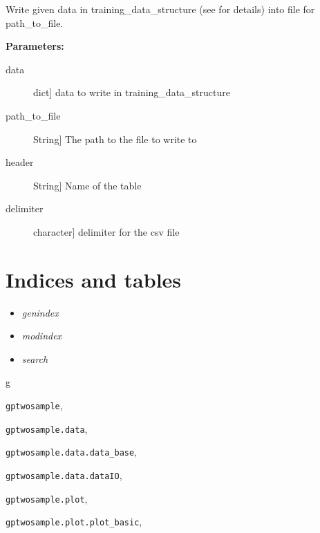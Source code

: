 \documentclass[letterpaper,10pt]{sphinxmanual}
\begin{document}

\begin{fulllineitems}
\label{data:gptwosample.data.dataIO.write_data_to_csv}
Write given data in training\_data\_structure (see {\hyperref[data:module-gptwosample.data.data_base]{}} for details)
into file for path\_to\_file.

\textbf{Parameters:}
\begin{description}
\item[{data}] \leavevmode{[}dict{]}
data to write in training\_data\_structure

\item[{path\_to\_file}] \leavevmode{[}String{]}
The path to the file to write to

\item[{header}] \leavevmode{[}String{]}
Name of the table

\item[{delimiter}] \leavevmode{[}character{]}
delimiter for the csv file

\end{description}

\end{fulllineitems}



\chapter{Indices and tables}
\label{index:indices-and-tables}\begin{itemize}
\item {} 
\emph{genindex}

\item {} 
\emph{modindex}

\item {} 
\emph{search}

\end{itemize}


\renewcommand{\indexname}{Python Module Index}
\begin{theindex}
\def\bigletter#1{{\Large\sffamily#1}\nopagebreak\vspace{1mm}}
\bigletter{g}
\item {\texttt{gptwosample}}, \pageref{base:module-gptwosample}
\item {\texttt{gptwosample.data}}, \pageref{data:module-gptwosample.data}
\item {\texttt{gptwosample.data.data\_base}}, \pageref{data:module-gptwosample.data.data_base}
\item {\texttt{gptwosample.data.dataIO}}, \pageref{data:module-gptwosample.data.dataIO}
\item {\texttt{gptwosample.plot}}, \pageref{plot:module-gptwosample.plot}
\item {\texttt{gptwosample.plot.plot\_basic}}, \pageref{plot:module-gptwosample.plot.plot_basic}
\end{theindex}

\renewcommand{\indexname}{Index}
\printindex
\end{document}
